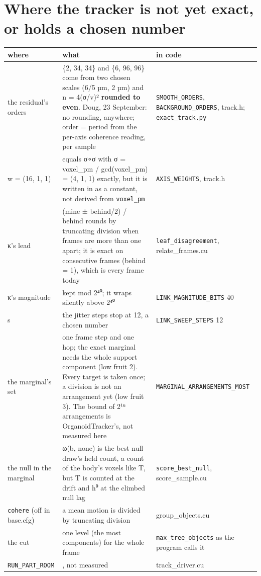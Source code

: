 \section{\texorpdfstring{Where the tracker is not yet exact, or holds a chosen number}{Where the tracker is not yet exact, or holds a chosen number}}

{\small
\setlength{\tabcolsep}{6pt}
\begin{longtable}{>{\RaggedRight\arraybackslash}p{}>{\RaggedRight\arraybackslash}p{}>{\RaggedRight\arraybackslash}p{}}
\toprule
where & what & in code \\
\midrule
\endhead
the residual's orders & \{2, 34, 34\} and \{6, 96, 96\} come from two chosen scales (6/5 µm, 2 µm) and n = 4(σ/v)² \textbf{rounded to even}. Doug, 23 September: no rounding, anywhere; order = period from the per-axis coherence reading, per sample & \texttt{SMOOTH\_\allowbreak{}ORDERS}, \texttt{BACKGROUND\_\allowbreak{}ORDERS}, track.h; \texttt{exact\_\allowbreak{}track.\allowbreak{}py} \\
w = (16, 1, 1) & equals σ∘σ with σ = voxel\_\allowbreak{}pm / gcd(voxel\_\allowbreak{}pm) = (4, 1, 1) exactly, but it is written in as a constant, not derived from \texttt{voxel\_\allowbreak{}pm} & \texttt{AXIS\_\allowbreak{}WEIGHTS}, track.h \\
κ's lead & (mine ± behind/2) / behind rounds by truncating division when frames are more than one apart; it is exact on consecutive frames (behind = 1), which is every frame today & \texttt{leaf\_\allowbreak{}disagreement}, relate\_\allowbreak{}frames.cu \\
κ's magnitude & kept mod 2⁴⁰; it wraps silently above 2⁴⁰ & \texttt{LINK\_\allowbreak{}MAGNITUDE\_\allowbreak{}BITS} 40 \\
s & the jitter steps stop at 12, a chosen number & \texttt{LINK\_\allowbreak{}SWEEP\_\allowbreak{}STEPS} 12 \\
the marginal's set & one frame step and one hop; the exact marginal needs the whole support component (low fruit 2). Every target is taken once; a division is not an arrangement yet (low fruit 3). The bound of 2¹⁶ arrangements is OrganoidTracker's, not measured here & \texttt{MARGINAL\_\allowbreak{}ARRANGEMENTS\_\allowbreak{}MOST} \\
the null in the marginal & ω(b, none) is the best null draw's held count, a count of the body's voxels like T, but T is counted at the drift and h⁰ at the climbed null lag & \texttt{score\_\allowbreak{}best\_\allowbreak{}null}, score\_\allowbreak{}sample.cu \\
\texttt{cohere} (off in base.cfg) & a mean motion is divided by truncating division & group\_\allowbreak{}objects.cu \\
the cut & one level (the most components) for the whole frame & \texttt{max\_\allowbreak{}tree\_\allowbreak{}objects} as the program calls it \\
\texttt{RUN\_\allowbreak{}PART\_\allowbreak{}ROOM} & 16, not measured & track\_\allowbreak{}driver.cu \\
\bottomrule
\end{longtable}
}

